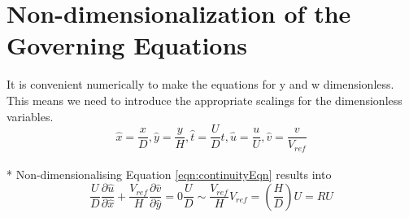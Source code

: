 \documentclass{article}
\begin{document}
\section{Non-dimensionalization of the Governing Equations}
It is convenient numerically to make the equations for y and w dimensionless. This means we need to introduce the appropriate scalings for the dimensionless variables.
\begin{equation}
\hat{x}=\frac{x}{D}, \hat{y}=\frac{y}{H},  \hat{t}=\frac{U}{D}t,  \hat{u}=\frac{u}{U},  \hat{v}=\frac{v}{V_{ref}}
\end{equation}
\\*
Non-dimensionalising Equation \ref{eqn:continuityEqn} results into 
\begin{subequations}
\begin{equation}
\frac{U}{D}\frac{\partial \hat{u}}{\partial \hat{x}} + \frac{V_{ref}}{H}\frac{\partial \hat{v}}{\partial \hat{y}} = 0  
\end{equation}
\begin{equation}
\frac{U}{D}\sim \frac{V_{ref}}{H}  
\end{equation}
\begin{equation}
V_{ref}= \left(\frac{H}{D}\right)U = RU  
\end{equation}
\end{subequations}
\end{document}
